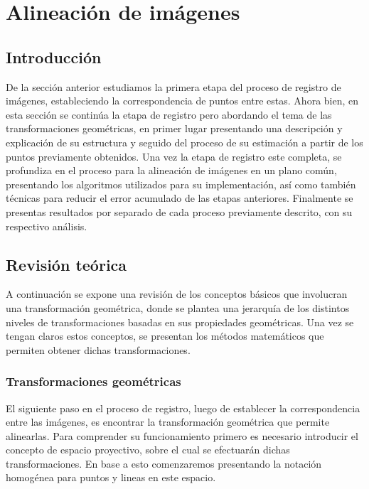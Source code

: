 \chapter{Alineación de imágenes}
\label{capitulo4}

\section{Introducción}

De la sección anterior estudiamos la primera etapa del proceso de registro de imágenes, estableciendo la correspondencia de puntos entre estas. Ahora bien, en esta sección se continúa la etapa de registro pero abordando el tema de las transformaciones geométricas, en primer lugar presentando una descripción y explicación de su estructura y seguido del proceso de su estimación a partir de los puntos previamente obtenidos. Una vez la etapa de registro este completa, se profundiza en el proceso para la alineación de imágenes en un plano común, presentando los algoritmos utilizados para su implementación, así como también técnicas para reducir el error acumulado de las etapas anteriores. Finalmente se presentas resultados por separado de cada proceso previamente descrito, con su respectivo análisis.

\section{Revisión teórica}

A continuación se expone una revisión de los conceptos básicos que involucran una transformación geométrica, donde se plantea una jerarquía de los distintos niveles de transformaciones basadas en sus propiedades geométricas. Una vez se tengan claros estos conceptos, se presentan los métodos matemáticos que permiten obtener dichas transformaciones. 

\subsection{Transformaciones geométricas}

El siguiente paso en el proceso de registro, luego de establecer la correspondencia entre las imágenes, es encontrar la transformación geométrica que permite alinearlas. Para comprender su funcionamiento primero es necesario introducir el concepto de espacio proyectivo, sobre el cual se efectuarán dichas transformaciones. En base a esto comenzaremos presentando la notación homogénea para puntos y lineas en este espacio.

